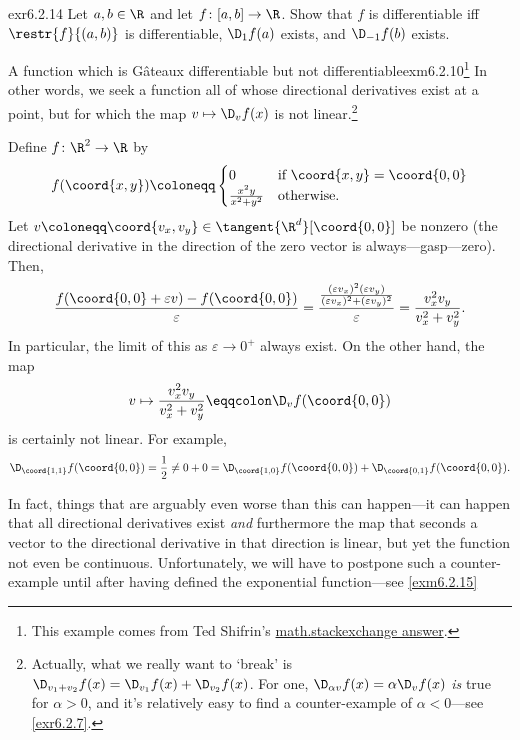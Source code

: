 \begin{exr}{}{exr6.2.14}
Let $a,b\in \R$ and let $f\colon [a,b]\rightarrow \R$.  Show that $f$ is differentiable iff $\restr{f}{(a,b)}$ is differentiable, $\D _1f(a)$ exists, and $\D _{-1}f(b)$ exists.
\end{exr}
\begin{exm}{A function which is Gâteaux differentiable but not differentiable}{exm6.2.10}\footnote{This example comes from Ted Shifrin's \href{http://math.stackexchange.com/questions/694486/show-that-the-directional-derivative-is-linear-by-definition}{math.stackexchange answer}.}
In other words, we seek a function all of whose directional derivatives exist at a point, but for which the map $v\mapsto \D _vf(x)$ is not linear.\footnote{Actually, what we really want to `break' is $\D _{v_1+v_2}f(x)=\D _{v_1}f(x)+\D _{v_2}f(x)$.  For one, $\D _{\alpha v}f(x)=\alpha \D _vf(x)$ \emph{is} true for $\alpha >0$, and it's relatively easy to find a counter-example of $\alpha <0$---see \cref{exr6.2.7}.}

Define $f\colon \R ^2\rightarrow \R$ by
\begin{equation}
f(\coord{x,y})\coloneqq \begin{cases}0 & \text{if }\coord{x,y}=\coord{0,0} \\ \frac{x^2y}{x^2+y^2} & \text{otherwise.}\end{cases}
\end{equation}
Let $v\coloneqq \coord{v_x,v_y}\in \tangent{\R ^d}[\coord{0,0}]$ be nonzero (the directional derivative in the direction of the zero vector is always---gasp---zero).  Then,
\begin{equation}
\frac{f(\coord{0,0}+\varepsilon v)-f(\coord{0,0})}{\varepsilon}=\frac{\frac{(\varepsilon v_x)^2(\varepsilon v_y)}{(\varepsilon v_x)^2+(\varepsilon v_y)^2}}{\varepsilon}=\frac{v_x^2v_y}{v_x^2+v_y^2}.
\end{equation}
In particular, the limit of this as $\varepsilon \to 0^+$ always exist.  On the other hand, the map
\begin{equation}
v\mapsto \frac{v_x^2v_y}{v_x^2+v_y^2}\eqqcolon \D _vf(\coord{0,0})
\end{equation}
is certainly not linear.  For example,
\begin{equation}
\D _{\coord{1,1}}f(\coord{0,0})=\frac{1}{2}\neq 0+0=\D _{\coord{1,0}}f(\coord{0,0})+\D _{\coord{0,1}}f(\coord{0,0}).
\end{equation}
\end{exm}
In fact, things that are arguably even worse than this can happen---it can happen that all directional derivatives exist \emph{and} furthermore the map that seconds a vector to the directional derivative in that direction is linear, but yet the function not even be continuous.  Unfortunately, we will have to postpone such a counter-example until after having defined the exponential function---see \cref{exm6.2.15}

